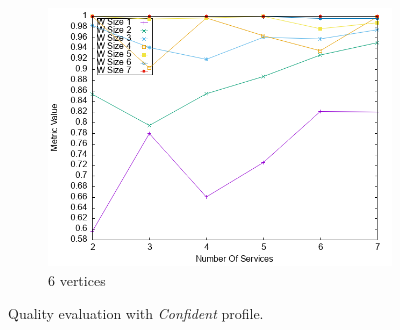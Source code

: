 \begin{figure}[ht]
\begin{subfigure}{0.33\textwidth}
    \includegraphics[width=\textwidth]{Images/graphs/newwindow_quality_performance_diff_perce_n7_s7_20_100_n7}
    \caption{6 vertices}
    \label{fig:third}
  \end{subfigure}
  \caption{ Quality evaluation with \textit{Confident} profile.}
  \label{fig:quality_window_good}
\end{figure}


